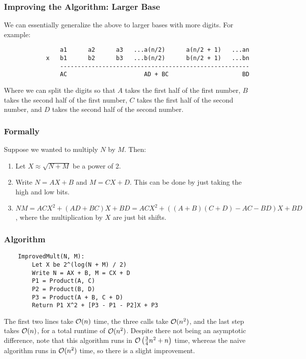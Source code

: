 \documentclass[letterpaper]{article}
\begin{document}
\subsubsection{Improving the Algorithm: Larger Base}
We can essentially generalize the above to larger bases with more digits. For example:
\begin{verbatim}
                a1      a2      a3   ...a(n/2)      a(n/2 + 1)   ...an
            x   b1      b2      b3   ...b(n/2)      b(n/2 + 1)   ...bn
                ------------------------------------------------------
                AC                      AD + BC                     BD 
\end{verbatim}
Where we can split the digits so that $A$ takes the first half of the first number, $B$ takes the second half of the first number, $C$ takes the first half of the second number, and $D$ takes the second half of the second number. 

\subsubsection{Formally}
Suppose we wanted to multiply $N$ by $M$. Then: 
\begin{enumerate}
    \item Let $X \approx \sqrt{N + M}$ be a power of 2. 
    \item Write $N = AX + B$ and $M = CX + D$. This can be done by just taking the high and low bits. 
    \item $NM = ACX^2 + (AD + BC)X + BD = ACX^2 + ((A + B)(C + D) - AC - BD)X + BD$, where the multiplication by $X$ are just bit shifts. 
\end{enumerate}

\subsubsection{Algorithm}
\begin{verbatim}
    ImprovedMult(N, M):
        Let X be 2^(log(N + M) / 2)
        Write N = AX + B, M = CX + D 
        P1 = Product(A, C)
        P2 = Product(B, D)
        P3 = Product(A + B, C + D)
        Return P1 X^2 + [P3 - P1 - P2]X + P3
\end{verbatim}
The first two lines take $\mathcal{O}(n)$ time, the three  calls take $\mathcal{O}(n^2)$, and the last step takes $\mathcal{O}(n)$, for a total runtime of $\mathcal{O}(n^2)$. Despite there not being an asymptotic difference, note that this algorithm runs in $\mathcal{O}\left(\frac{3}{4}n^2 + n\right)$ time, whereas the naive algorithm runs in $\mathcal{O}(n^2)$ time, so there is a slight improvement. 
\end{document}
